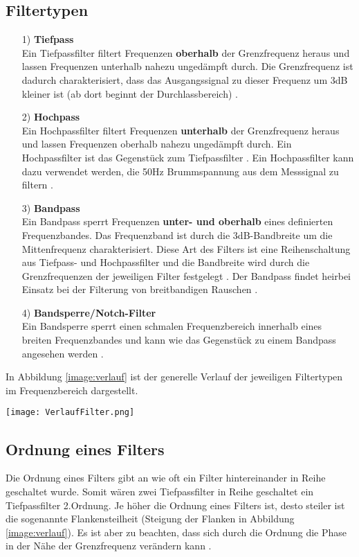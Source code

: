 \subsection*{Filtertypen}
\begin{itemize}
    \item[1)]\textbf{Tiefpass}\\
    Ein Tiefpassfilter filtert Frequenzen \textbf{oberhalb} der Grenzfrequenz heraus und lassen Frequenzen unterhalb nahezu ungedämpft durch. Die Grenzfrequenz ist dadurch charakterisiert, dass das Ausgangssignal zu dieser Frequenz um 3dB kleiner ist (ab dort beginnt der Durchlassbereich) \citep{electronik}.
    \item[2)]\textbf{Hochpass}\\
    Ein Hochpassfilter filtert Frequenzen \textbf{unterhalb} der Grenzfrequenz heraus und lassen Frequenzen oberhalb nahezu ungedämpft durch. Ein Hochpassfilter ist das Gegenstück zum Tiefpassfilter \citep{electronik}. Ein Hochpassfilter kann dazu verwendet werden, die 50Hz Brummspannung aus dem Messsignal zu filtern \citep{VA}.
    \item[3)]\textbf{Bandpass}\\
    Ein Bandpass sperrt Frequenzen \textbf{unter- und oberhalb} eines definierten Frequenzbandes. Das Frequenzband ist durch die 3dB-Bandbreite um die Mittenfrequenz charakterisiert. Diese Art des Filters ist eine Reihenschaltung aus Tiefpass- und Hochpassfilter und die Bandbreite wird durch die Grenzfrequenzen der jeweiligen Filter festgelegt \citep{electronik}. Der Bandpass findet heirbei Einsatz bei der Filterung von breitbandigen Rauschen \citep{VA}.
    \item[4)]\textbf{Bandsperre/Notch-Filter}\\
    Ein Bandsperre sperrt einen schmalen Frequenzbereich innerhalb eines breiten Frequenzbandes und kann wie das Gegenstück zu einem Bandpass angesehen werden \citep{electronik}.
\end{itemize}
In Abbildung \ref{image:verlauf} ist der generelle Verlauf der jeweiligen Filtertypen im Frequenzbereich dargestellt.
\newpage
\begin{center}
    \texttt{[image: VerlaufFilter.png]}
    \label{image:verlauf}
\end{center}
\subsection*{Ordnung eines Filters}
Die Ordnung eines Filters gibt an wie oft ein Filter hintereinander in Reihe geschaltet wurde. Somit wären zwei Tiefpassfilter in Reihe geschaltet ein Tiefpassfilter 2.Ordnung. Je höher die Ordnung eines Filters ist, desto steiler ist die sogenannte Flankensteilheit (Steigung der Flanken in Abbildung \ref{image:verlauf}). Es ist aber zu beachten, dass sich durch die Ordnung die Phase in der Nähe der Grenzfrequenz verändern kann \citep{electronik}.
